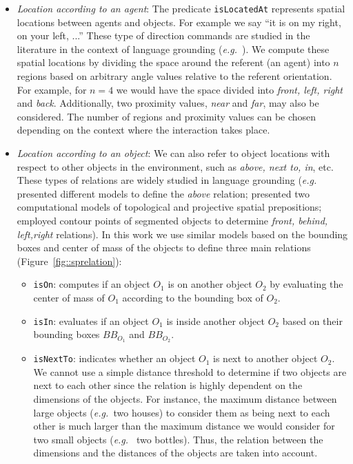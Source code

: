 \documentclass[twocolumn]{svjour3}
\newcommand{\concept}[1]{{\footnotesize \texttt{#1}}}
\newcommand{\eg}{{\textit{e.g.~}}}
\begin{document}
\begin{itemize} 

\item \emph{Location according to an agent}: The predicate
\concept{isLocatedAt} represents spatial locations between agents and objects.
For example we say ``it is on my right, on your left, ...'' These type of direction commands are studied
in the literature in the context of language grounding (\eg \cite{O'Keefe1999,Matuszek2010}). We compute these
spatial locations by dividing the space around the referent (an agent) into $n$
regions based on arbitrary angle values relative to the referent orientation.
For example, for $n = 4$ we would have the space divided into \emph{front,
left, right} and \emph{back}. Additionally, two proximity values, \emph{near}
and \emph{far}, may also be considered. The number of regions and proximity
values can be chosen depending on the context where the interaction takes
place.

\item \emph{Location according to an object}: We can also refer to object
locations with respect to other objects in the environment, such as \emph{above,
next to, in}, etc. These types of relations are widely studied in language
grounding (\eg \cite{Regier2001} presented different models to define the
\emph{above} relation; \cite{Kelleher2009} presented two computational models of topological and projective spatial prepositions; \cite{Blisard2005} employed contour points of segmented objects to determine \emph{front, behind, left,right} relations). In this work we use similar models based on the
bounding boxes and center of mass of the objects to define three main relations
(Figure~\ref{fig::sprelation}): 

\begin{itemize}
	\item \concept{isOn}: computes if an object $O_1$ is on another object $O_2$ by
	evaluating the center of mass of $O_1$ according to the bounding box of $O_2$.

	\item \concept{isIn}: evaluates if an object $O_1$ is inside another object
	$O_2$ based on their bounding boxes $BB_{O_1}$ and $BB_{O_2}$.

	\item \concept{isNextTo}: indicates whether an object $O_1$ is next to another
	object $O_2$. We cannot use a simple distance threshold to determine if two
	objects are next to each other since the relation is highly dependent on the
	dimensions of the objects. For instance, the maximum distance between large
	objects (\eg two houses) to consider them as being next to each other is much
	larger than the maximum distance we would consider for two small objects (\eg
	two bottles). Thus, the relation between the dimensions and the distances of
	the objects are taken into account.  


\end{itemize}
\end{itemize}
\end{document}
